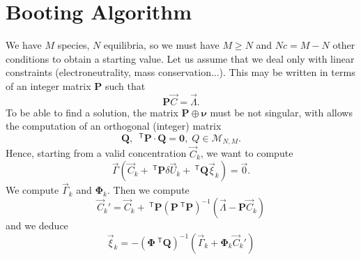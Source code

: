 \documentclass[aps]{revtex4}
\newcommand{\mymat}[1]{\bm{#1}}
\newcommand{\mytrn}[1]{~^{\mathsf{T}}{#1}}
\begin{document}
\section{Booting Algorithm}
We have $M$ species, $N$ equilibria, 
so we must have $M\geq N$ and $Nc=M-N$ other conditions
to obtain a starting value.
Let us assume that we deal only with linear constraints (electroneutrality, mass conservation...).
This may be written in terms of an integer matrix $\mymat{P}$
such that
$$
	\mymat{P}\vec{C} = \vec{\Lambda}.
$$
To be able to find a solution, the matrix $\mymat{P}\oplus\mymat{\nu}$ must
be not singular, with allows the computation of an orthogonal (integer) matrix
$$
	\mymat{Q},\;\mytrn{\mymat{P}}\cdot\mymat{Q} = \mymat{0},\;Q\in\mathcal{M}_{N,M}.
$$
Hence, starting from a valid concentration $\vec{C}_k$, we want to compute
$$
	\vec{\Gamma}
	\left(
		\vec{C}_k+\mytrn{\mymat{P}}\delta\vec{U}_k + \mytrn{\mymat{Q}}\vec{\xi}_k
		\right) = \vec{0}.
$$
We compute $\vec{\Gamma}_k$ and $\mymat{\Phi}_k$. Then we
compute
$$
	\vec{C}_k' = \vec{C}_k + \mytrn{\mymat{P}}\left(\mymat{P}\mytrn{\mymat{P}}\right)^{-1}\left(\vec{\Lambda}-\mymat{P}\vec{C}_k\right)
$$
and we deduce
$$
	\vec{\xi}_k = -\left(\mymat{\Phi}\mytrn{\mymat{Q}}\right)^{-1}\left(\vec{\Gamma}_k+\mymat{\Phi}_k \vec{C}_k'\right)
$$
\end{document}
